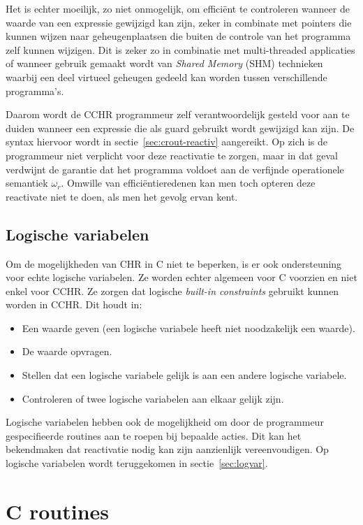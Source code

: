 Het is echter moeilijk, zo niet onmogelijk, om effici\"ent te controleren wanneer de waarde van een expressie gewijzigd kan zijn, zeker in combinate met pointers die kunnen wijzen naar geheugenplaatsen die buiten de controle van het programma zelf kunnen wijzigen. Dit is zeker zo in combinatie met multi-threaded applicaties of wanneer gebruik gemaakt wordt van {\em Shared Memory} (SHM) technieken waarbij een deel virtueel geheugen gedeeld kan worden tussen verschillende programma's.

Daarom wordt de CCHR programmeur zelf verantwoordelijk gesteld voor aan te duiden wanneer een expressie die als guard gebruikt wordt gewijzigd kan zijn. De syntax hiervoor wordt in sectie~\ref{sec:crout-reactiv} aangereikt. Op zich is de programmeur niet verplicht voor deze reactivatie te zorgen, maar in dat geval verdwijnt de garantie dat het programma voldoet aan de verfijnde operationele semantiek $\omega_r$. Omwille van effici\"entieredenen kan men toch opteren deze reactivate niet te doen, als men het gevolg ervan kent.

\subsection{Logische variabelen}

Om de mogelijkheden van CHR in C niet te beperken, is er ook ondersteuning voor echte logische variabelen. Ze worden echter algemeen voor C voorzien en niet enkel voor CCHR. Ze zorgen dat logische {\em built-in constraints} gebruikt kunnen worden in CCHR. Dit houdt in: \begin{itemize}
  \item Een waarde geven (een logische variabele heeft niet noodzakelijk een waarde).
  \item De waarde opvragen.
  \item Stellen dat een logische variabele gelijk is aan een andere logische variabele.
  \item Controleren of twee logische variabelen aan elkaar gelijk zijn.
\end{itemize}

Logische variabelen hebben ook de mogelijkheid om door de programmeur gespecifieerde routines aan te roepen bij bepaalde acties. Dit kan het bekendmaken dat reactivatie nodig kan zijn aanzienlijk vereenvoudigen. Op logische variabelen wordt teruggekomen in sectie~\ref{sec:logvar}.

\section{C routines}

